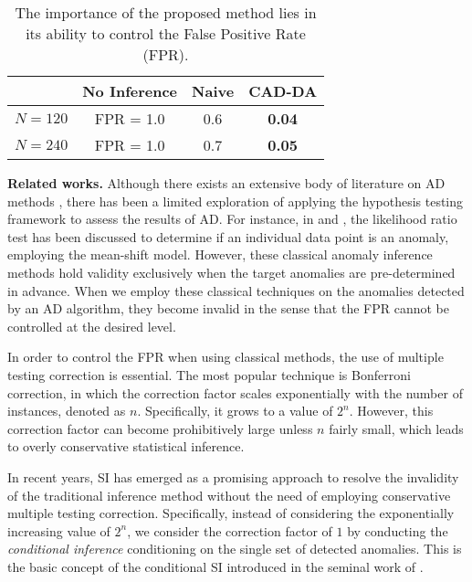 \begin{table}[t]
\renewcommand{\arraystretch}{1.2}
\centering
\caption{The importance of the proposed method lies in its ability to control the False Positive Rate (FPR).}
\vspace{-5pt}
\begin{tabular}{ |l|c|c|c| } 
  \hline
  & \textbf{No Inference} & \textbf{Naive} & \textbf{CAD-DA} \\
  \hline
  $N = 120$ & FPR = 1.0 & 0.6 & \textbf{0.04} \\
   \hline
  $N = 240$ & FPR = 1.0 & 0.7 & \textbf{0.05} \\
  \hline
\end{tabular}
\label{tbl:example_intro}
\vspace{-10pt}
\end{table}



\textbf{Related works.}
Although there exists an extensive body of literature on AD methods \cite{aggarwal2017outlier}, there has been a limited exploration of applying the hypothesis testing framework to assess the results of AD. 
%
For instance, in \cite{srivastava1998outliers} and \cite{pan1995multiple}, the likelihood ratio test has been discussed to determine if an individual data point is an anomaly, employing the mean-shift model.
%
However, these classical anomaly inference methods hold validity exclusively when the target anomalies are pre-determined in advance. 
%
When we employ these classical techniques on the anomalies detected by an AD algorithm, they become invalid in the sense that the FPR cannot be controlled at the desired level.


In order to control the FPR when using classical methods, the use of multiple testing correction is essential.
%
The most popular technique is Bonferroni correction, in which the correction factor scales exponentially with the number of instances, denoted as $n$. 
%
Specifically, it grows to a value of $2^n$.
%
However, this correction factor can become prohibitively large unless $n$ fairly small, which leads to overly conservative statistical inference.



In recent years, SI has emerged as a promising approach to resolve the invalidity of the traditional inference method without the need of employing conservative multiple testing correction. 
%
Specifically, instead of considering the exponentially increasing value of $2^n$, we  consider the correction factor of $1$ by conducting the \emph{conditional inference} conditioning on the single set of detected anomalies. 
%
This is the basic concept of the conditional SI introduced in the seminal work of  \cite{lee2016exact}.


